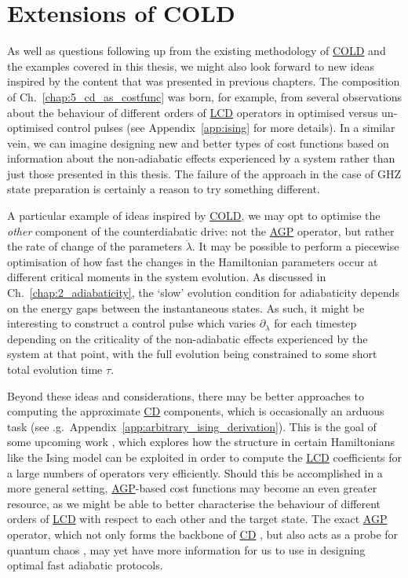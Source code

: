 \documentclass[a4paper,oneside,11pt]{book}
\newcommand{\dlambda}{\partial_{\lambda}}
\newcommand{\dotlambda}{\dot{\lambda}}
\newcommand{\acrref}[1]{\hyperref[acr:#1]{#1}}
\begin{document}
\section{Extensions of COLD}

As well as questions following up from the existing methodology of \acrref{COLD} and the examples covered in this thesis, we might also look forward to new ideas inspired by the content that was presented in previous chapters. The composition of Ch.~\ref{chap:5_cd_as_costfunc} was born, for example, from several observations about the behaviour of different orders of \acrref{LCD} operators in optimised versus un-optimised control pulses (see Appendix~\ref{app:ising} for more details). In a similar vein, we can imagine designing new and better types of cost functions based on information about the non-adiabatic effects experienced by a system rather than just those presented in this thesis. The failure of the approach in the case of GHZ state preparation is certainly a reason to try something different.

A particular example of ideas inspired by \acrref{COLD}, we may opt to optimise the \emph{other} component of the counterdiabatic drive: not the \acrref{AGP} operator, but rather the rate of change of the parameters $\dotlambda$. It may be possible to perform a piecewise optimisation of how fast the changes in the Hamiltonian parameters occur at different critical moments in the system evolution. As discussed in Ch.~\ref{chap:2_adiabaticity}, the `slow' evolution condition for adiabaticity depends on the energy gaps between the instantaneous states. As such, it might be interesting to construct a control pulse which varies $\dlambda$ for each timestep depending on the criticality of the non-adiabatic effects experienced by the system at that point, with the full evolution being constrained to some short total evolution time $\tau$.

Beyond these ideas and considerations, there may be better approaches to computing the approximate \acrref{CD} components, which is occasionally an arduous task (see \@e.g.~Appendix~\ref{app:arbitrary_ising_derivation}). This is the goal of some upcoming work \cite{lawrence_numerical_2023}, which explores how the structure in certain Hamiltonians like the Ising model can be exploited in order to compute the \acrref{LCD} coefficients for a large numbers of operators very efficiently. Should this be accomplished in a more general setting, \acrref{AGP}-based cost functions may become an even greater resource, as we might be able to better characterise the behaviour of different orders of \acrref{LCD} with respect to each other and the target state. The exact \acrref{AGP} operator, which not only forms the backbone of \acrref{CD} \cite{kolodrubetz_geometry_2017, sels_minimizing_2017}, but also acts as a probe for quantum chaos \cite{pandey_adiabatic_2020, bhattacharjee_lanczos_2023}, may yet have more information for us to use in designing optimal fast adiabatic protocols.
\end{document}
